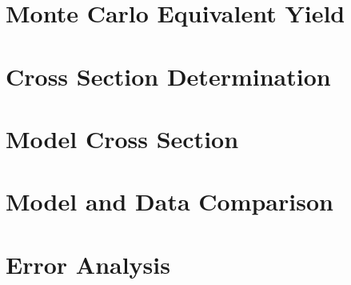 \label{Chapter-8}

\hypertarget{Section-8.1}{%
\section{Monte Carlo Equivalent Yield}\label{Section-8.1}}

\hypertarget{Section-8.2}{%
\section{Cross Section Determination}\label{Section-8.2}}

\hypertarget{Section-8.3}{%
\section{Model Cross Section}\label{Section-8.3}}

\hypertarget{Section-8.4}{%
\section{Model and Data Comparison}\label{Section-8.4}}

\hypertarget{Section-8.5}{%
\section{Error Analysis}\label{Section-8.5}}


